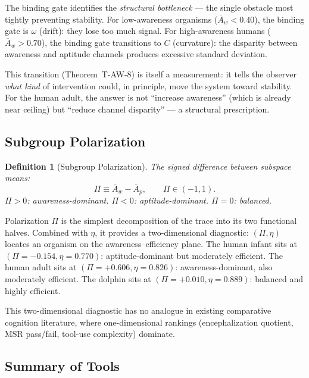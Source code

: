 \documentclass[
  aps,
  prd,
  twocolumn,
  superscriptaddress,
  nofootinbib,
  floatfix
]{revtex4-2}
\newtheorem{definition}[theorem]{Definition}
\newcommand{\beq}{\begin{equation}}
\newcommand{\eeq}{\end{equation}}
\newcommand{\Aw}{\overline{A}_{\!w}}
\newcommand{\Ap}{\overline{A}_{\!p}}
\begin{document}
The binding gate identifies the \emph{structural bottleneck}
--- the single obstacle most tightly preventing stability.
For low-awareness organisms ($\Aw < 0.40$), the binding
gate is $\omega$ (drift): they lose too much signal.  For
high-awareness humans ($\Aw > 0.70$), the binding gate
transitions to $C$ (curvature): the disparity between
awareness and aptitude channels produces excessive
standard deviation.

This transition (Theorem~T-AW-8) is itself a measurement:
it tells the observer \emph{what kind} of intervention
could, in principle, move the system toward stability.
For the human adult, the answer is not ``increase
awareness'' (which is already near ceiling) but ``reduce
channel disparity'' --- a structural prescription.

\subsection{Subgroup Polarization}

\begin{definition}[Subgroup Polarization]\label{def:polar}
The signed difference between subspace means:
\beq\label{eq:polar}
  \Pi \equiv \Aw - \Ap,
  \qquad \Pi \in (-1, 1).
\eeq
$\Pi > 0$: awareness-dominant.
$\Pi < 0$: aptitude-dominant.  $\Pi = 0$: balanced.
\end{definition}

Polarization $\Pi$ is the simplest decomposition of the
trace into its two functional halves.  Combined with
$\eta$, it provides a two-dimensional diagnostic:
$(\Pi, \eta)$ locates an organism on the
awareness--efficiency plane.  The human infant sits at
$(\Pi = -0.154, \eta = 0.770)$: aptitude-dominant but
moderately efficient.  The human adult sits at
$(\Pi = +0.606, \eta = 0.826)$: awareness-dominant,
also moderately efficient.  The dolphin sits at
$(\Pi = +0.010, \eta = 0.889)$: balanced and
highly efficient.

This two-dimensional diagnostic has no analogue in
existing comparative cognition literature, where
one-dimensional rankings (encephalization quotient,
MSR pass/fail, tool-use complexity) dominate.

\subsection{Summary of Tools}
\end{document}
